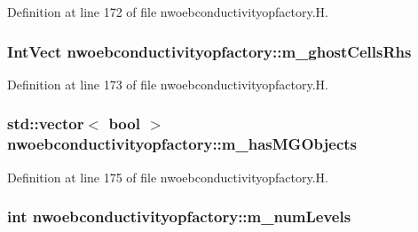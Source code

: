 Definition at line 172 of file nwoebconductivityopfactory.\+H.

\subsubsection[{\texorpdfstring{m\+\_\+ghost\+Cells\+Rhs}{m_ghostCellsRhs}}]{\setlength{\rightskip}{0pt plus 5cm}Int\+Vect nwoebconductivityopfactory\+::m\+\_\+ghost\+Cells\+Rhs\hspace{0.3cm}{\ttfamily [protected]}}\hypertarget{classnwoebconductivityopfactory_ab3e8b54159443f7dbec0d53dd09ddd7b}{}\label{classnwoebconductivityopfactory_ab3e8b54159443f7dbec0d53dd09ddd7b}


Definition at line 173 of file nwoebconductivityopfactory.\+H.

\subsubsection[{\texorpdfstring{m\+\_\+has\+M\+G\+Objects}{m_hasMGObjects}}]{\setlength{\rightskip}{0pt plus 5cm}std\+::vector$<$ bool $>$ nwoebconductivityopfactory\+::m\+\_\+has\+M\+G\+Objects\hspace{0.3cm}{\ttfamily [protected]}}\hypertarget{classnwoebconductivityopfactory_a9be42c2983f8fd64cadd8957971ecfab}{}\label{classnwoebconductivityopfactory_a9be42c2983f8fd64cadd8957971ecfab}


Definition at line 175 of file nwoebconductivityopfactory.\+H.

\subsubsection[{\texorpdfstring{m\+\_\+num\+Levels}{m_numLevels}}]{\setlength{\rightskip}{0pt plus 5cm}int nwoebconductivityopfactory\+::m\+\_\+num\+Levels\hspace{0.3cm}{\ttfamily [protected]}}\hypertarget{classnwoebconductivityopfactory_aed5082e49870dd931f816990ffe73bcc}{}\label{classnwoebconductivityopfactory_aed5082e49870dd931f816990ffe73bcc}


